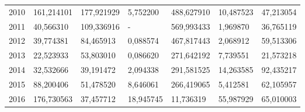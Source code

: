 \begin{table}
\begin{tabular}{p{1cm}p{2cm}p{2cm}p{2cm}p{2cm}p{2cm}p{2cm}}
 2010 &      161,214101 &   177,921929 &       5,752200 &                                         488,627910 &                           10,487523 &                             47,213054 \\
 2011 &       40,566310 &   109,336916 &              - &                                         569,993433 &                            1,969870 &                             36,765119 \\
 2012 &       39,774381 &    84,465913 &       0,088574 &                                         467,817443 &                            2,068912 &                             59,513306 \\
 2013 &       22,523933 &    53,803010 &       0,086620 &                                         271,642192 &                            7,739551 &                             21,573218 \\
 2014 &       32,532666 &    39,191472 &       2,094338 &                                         291,581525 &                           14,263585 &                             92,435217 \\
 2015 &       88,200406 &    51,478520 &       8,646061 &                                         266,419065 &                            5,412581 &                             62,105957 \\
 2016 &      176,730563 &    37,457712 &      18,945745 &                                          11,736319 &                           55,987929 &                             65,010003 \\
\bottomrule
\end{tabular}
\end{table}
